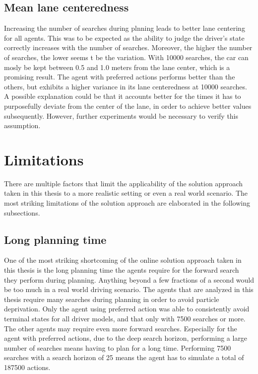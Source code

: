 

\subsection{Mean lane centeredness}

Increasing the number of searches during plnning leads to better lane centering for all agents. This was to be expected as the ability to judge the driver's state correctly increases with the number of searches. Moreover, the higher the number of searches, the lower seems t be the variation. With 10000 searches, the car can mosly be kept between 0.5 and 1.0 meters from the lane center, which is a promising result. The agent with preferred actions performs better than the others, but exhibits a higher variance in its lane centeredness at 10000 searches. A possible explanation could be that it accounts better for the times it has to purposefully deviate from the center of the lane, in order to achieve better values subsequently. However, further experiments would be necessary to verify this assumption.

\section{Limitations}
\label{sec:limitations}

There are multiple factors that limit the applicability of the solution approach taken in this thesis to a more realistic setting or even a real world scenario. The most striking limitations of the solution approach are elaborated in the following subsections.

\subsection{Long planning time}


One of the most striking shortcoming of the online solution approach taken in this thesis is the long planning time the agents require for the forward search they perform during planning. Anything beyond a few fractions of a second would be too much in a real world driving scenario. The agents that are analyzed in this thesis require many searches during planning in order to avoid particle deprivation. Only the agent using preferred action was able to consistently avoid terminal states for all driver models, and that only with 7500 searches or more. The other agents may require even more forward searches. Especially for the agent with preferred actions, due to the deep search horizon, performing a large number of searches means having to plan for a long time. Performing 7500 searches with a search horizon of 25 means the agent has to simulate a total of 187500 actions.

